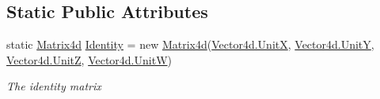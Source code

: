 \subsection*{Static Public Attributes}
\begin{DoxyCompactItemize}
\item 
static \hyperlink{struct_open_t_k_1_1_matrix4d}{Matrix4d} \hyperlink{struct_open_t_k_1_1_matrix4d_af14a29e7a625e5ce6753f3b144fdfc3d}{Identity} = new \hyperlink{struct_open_t_k_1_1_matrix4d}{Matrix4d}(\hyperlink{struct_open_t_k_1_1_vector4d_a8b680bfc1a34f35c9b6c1f86c4d13a78}{Vector4d.\-Unit\-X}, \hyperlink{struct_open_t_k_1_1_vector4d_ae5a0e650e3a76c7cbb541c84d25934ac}{Vector4d.\-Unit\-Y}, \hyperlink{struct_open_t_k_1_1_vector4d_a362b8ee3aa8ea327234d5082c4320404}{Vector4d.\-Unit\-Z}, \hyperlink{struct_open_t_k_1_1_vector4d_aed38a8e576f79b30e7310255089e3e3e}{Vector4d.\-Unit\-W})
\begin{DoxyCompactList}\small\item\em The identity matrix \end{DoxyCompactList}\end{DoxyCompactItemize}
